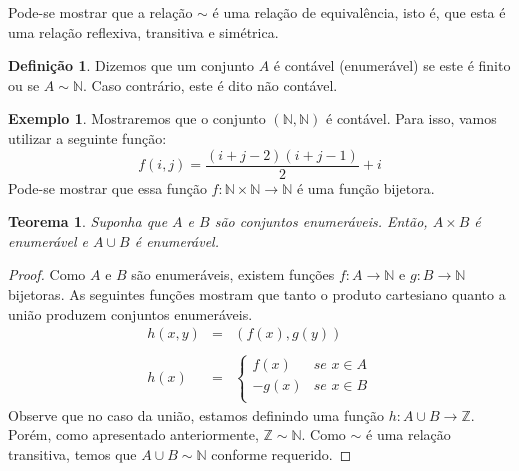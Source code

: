 \documentclass[a4paper]{article}
\newtheorem{Theorem}{Teorema}
\theoremstyle{definition}
\newtheorem{Example}{Exemplo}
\newtheorem{Definition}{Definição}
\begin{document}
  Pode-se mostrar que a relação $\sim$ é uma relação de equivalência, isto é,
  que esta é uma relação reflexiva, transitiva e simétrica.

  \begin{Definition}
    Dizemos que um conjunto $A$ é contável (enumerável) se este é finito ou se $A
    \sim\mathbb{N}$. Caso contrário, este é dito não contável.
  \end{Definition}

  \begin{Example}
    Mostraremos que o conjunto $(\mathbb{N},\mathbb{N})$ é contável. Para isso,
    vamos utilizar a seguinte função:
    \[
      f(i,j) = \frac{(i + j - 2)(i + j - 1)}{2} + i
    \]
    Pode-se mostrar que essa função $f : \mathbb{N}\times\mathbb{N}\to
    \mathbb{N}$ é uma função bijetora.
  \end{Example}

  \begin{Theorem}
    Suponha que $A$ e $B$ são conjuntos enumeráveis. Então, $A\times B$ é
    enumerável e $A \cup B$ é enumerável.
  \end{Theorem}
  \begin{proof}
    Como $A$ e $B$ são enumeráveis, existem funções $f : A \to \mathbb{N}$ e
    $g : B \to \mathbb{N}$ bijetoras. As seguintes funções mostram que tanto o
    produto cartesiano quanto a união produzem conjuntos enumeráveis.
    \[
      \begin{array}{lcl}
        h(x,y) & = & (f(x),g(y))\\ \\
        h(x) & = & \left\{
                   \begin{array}{ll}
                     f(x)  & \textit{se }x\in A\\
                     -g(x) & \textit{se }x \in B\\
                   \end{array}
                   \right.
      \end{array}
    \]
    Observe que no caso da união, estamos definindo uma função $h : A \cup B \to
    \mathbb{Z}$. Porém, como apresentado anteriormente, $\mathbb{Z}\sim
    \mathbb{N}$. Como $\sim$ é uma relação transitiva, temos que $A \cup B \sim
    \mathbb{N}$ conforme requerido.
  \end{proof}
\end{document}
